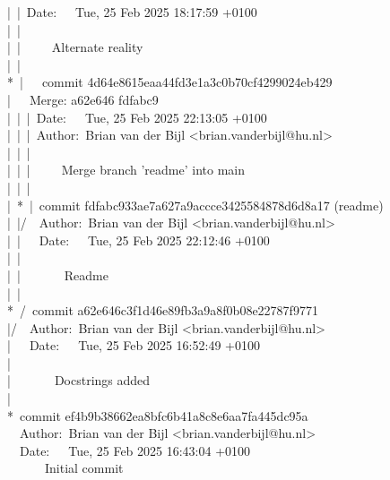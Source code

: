 \begin{aside}
\begin{bash}
{\color{ttgreen}|}\ {\color{ttyellow}|}\ Date:\ \ \ Tue, 25 Feb 2025 18:17:59 +0100    \\
{\color{ttgreen}|}\ {\color{ttyellow}|} \\
{\color{ttgreen}|}\ {\color{ttyellow}|}\ \ \ \ \ Alternate reality    \\
{\color{ttgreen}|}\ {\color{ttyellow}|} \\
*\ {\color{ttyellow}|}\ \ \ {\color{ttyellow}commit 4d64e8615eaa44fd3e1a3c0b70cf4299024eb429}   \\
{\color{ttblue}|}{\color{ttpurple}}\ {\color{ttyellow}}\ \ Merge: a62e646 fdfabc9 \\
{\color{ttblue}|}\ {\color{ttpurple}|}\ {\color{ttyellow}|}\ Date:\ \ \ Tue, 25 Feb 2025 22:13:05 +0100 \\
{\color{ttblue}|}\ {\color{ttpurple}|}\ {\color{ttyellow}|}\ Author:\ Brian van der Bijl <brian.vanderbijl@hu.nl> \\
{\color{ttblue}|}\ {\color{ttpurple}|}\ {\color{ttyellow}|} \\
{\color{ttblue}|}\ {\color{ttpurple}|}\ {\color{ttyellow}|}\ \ \ \ \ Merge branch 'readme' into main    \\
{\color{ttblue}|}\ {\color{ttpurple}|}\ {\color{ttyellow}|} \\
{\color{ttblue}|}\ *\ {\color{ttyellow}|}\ {\color{ttyellow}commit fdfabc933ae7a627a9accce3425584878d6d8a17 ({\color{ttgreen}readme})} \\
{\color{ttblue}|}\ {\color{ttyellow}|}{\color{ttyellow}/}\ \ Author:\ Brian van der Bijl <brian.vanderbijl@hu.nl>  \\
{\color{ttblue}|}\ {\color{ttyellow}|}\ \ \ Date:\ \ \ Tue, 25 Feb 2025 22:12:46 +0100    \\
{\color{ttblue}|}\ {\color{ttyellow}|} \ \ \\
{\color{ttblue}|}\ {\color{ttyellow}|}\ \ \ \ \ \ \ Readme   \\
{\color{ttblue}|}\ {\color{ttyellow}|} \ \ \\
*\ {\color{ttyellow}/}\ {\color{ttyellow}commit a62e646c3f1d46e89fb3a9a8f0b08e22787f9771}   \\
{\color{ttyellow}|}{\color{ttyellow}/}\ \ Author:\ Brian van der Bijl <brian.vanderbijl@hu.nl>\\
{\color{ttyellow}|}\ \ \ Date:\ \ \ Tue, 25 Feb 2025 16:52:49 +0100 \\
{\color{ttyellow}|} \\
{\color{ttyellow}|}\ \ \ \ \ \ \ Docstrings added    \\
{\color{ttyellow}|} \\
*\ {\color{ttyellow}commit ef4b9b38662ea8bfc6b41a8c8e6aa7fa445dc95a}   \\
\ \ Author:\ Brian van der Bijl <brian.vanderbijl@hu.nl>  \\
\ \ Date:\ \ \ Tue, 25 Feb 2025 16:43:04 +0100   
~\\
\ \ \ \ \ \ Initial commit \\
\end{bash}
\end{aside}

